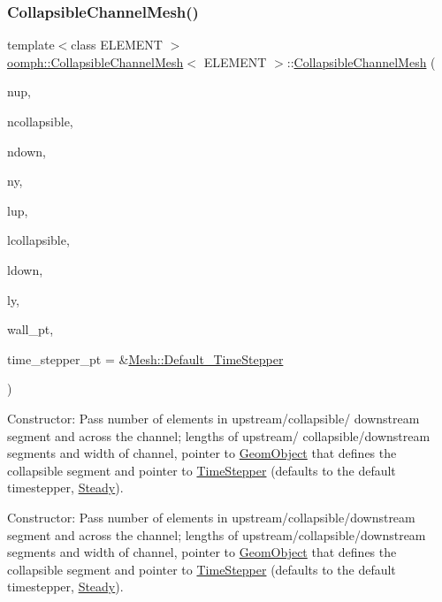 \subsubsection{\texorpdfstring{Collapsible\+Channel\+Mesh()}{CollapsibleChannelMesh()}}
{\footnotesize\ttfamily template$<$class E\+L\+E\+M\+E\+NT $>$ \\
\hyperlink{classoomph_1_1CollapsibleChannelMesh}{oomph\+::\+Collapsible\+Channel\+Mesh}$<$ E\+L\+E\+M\+E\+NT $>$\+::\hyperlink{classoomph_1_1CollapsibleChannelMesh}{Collapsible\+Channel\+Mesh} (\begin{DoxyParamCaption}\item[{const unsigned \&}]{nup,  }\item[{const unsigned \&}]{ncollapsible,  }\item[{const unsigned \&}]{ndown,  }\item[{const unsigned \&}]{ny,  }\item[{const double \&}]{lup,  }\item[{const double \&}]{lcollapsible,  }\item[{const double \&}]{ldown,  }\item[{const double \&}]{ly,  }\item[{\hyperlink{classoomph_1_1GeomObject}{Geom\+Object} $\ast$}]{wall\+\_\+pt,  }\item[{\hyperlink{classoomph_1_1TimeStepper}{Time\+Stepper} $\ast$}]{time\+\_\+stepper\+\_\+pt = {\ttfamily \&\hyperlink{classoomph_1_1Mesh_a12243d0fee2b1fcee729ee5a4777ea10}{Mesh\+::\+Default\+\_\+\+Time\+Stepper}} }\end{DoxyParamCaption})}



Constructor\+: Pass number of elements in upstream/collapsible/ downstream segment and across the channel; lengths of upstream/ collapsible/downstream segments and width of channel, pointer to \hyperlink{classoomph_1_1GeomObject}{Geom\+Object} that defines the collapsible segment and pointer to \hyperlink{classoomph_1_1TimeStepper}{Time\+Stepper} (defaults to the default timestepper, \hyperlink{classoomph_1_1Steady}{Steady}). 

Constructor\+: Pass number of elements in upstream/collapsible/downstream segment and across the channel; lengths of upstream/collapsible/downstream segments and width of channel, pointer to \hyperlink{classoomph_1_1GeomObject}{Geom\+Object} that defines the collapsible segment and pointer to \hyperlink{classoomph_1_1TimeStepper}{Time\+Stepper} (defaults to the default timestepper, \hyperlink{classoomph_1_1Steady}{Steady}). 

